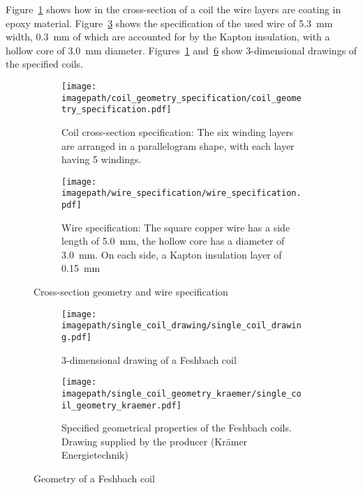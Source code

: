 Figure~\ref{fig:coil_geometry_specification} shows how in the cross-section of a coil the wire layers are coating in epoxy material. Figure~\ref{fig:wire_specification} shows the specification of the used wire of \SI{5.3}{\milli\meter} width, \SI{0.3}{\milli\meter} of which are accounted for by the Kapton insulation, with a hollow core of \SI{3.0}{\milli\meter} diameter. Figures~\ref{fig:coil_geometry_specification} and~\ref{fig:single_coil_geometry_kraemer} show 3-dimensional drawings of the specified coils.

\begin{figure}
    \centering
    \begin{subfigure}[t]{0.45\textwidth}
        \centering
        \texttt{[image: \\imagepath/coil\_geometry\_specification/coil\_geometry\_specification.pdf]}
        \caption{Coil cross-section specification: The six winding layers are arranged in a parallelogram shape, with each layer having 5 windings.}
        \label{fig:coil_geometry_specification}
    \end{subfigure}
    \hspace{0.09\textwidth}
    \begin{subfigure}[t]{0.45\textwidth}
        \centering
        \texttt{[image: \\imagepath/wire\_specification/wire\_specification.pdf]}
        \caption{Wire specification: The square copper wire has a side length of \SI{5.0}{\milli\meter}, the hollow core has a diameter of \SI{3.0}{\milli\meter}. On each side, a Kapton insulation layer of \SI{0.15}{\milli\meter} }
        \label{fig:wire_specification}
    \end{subfigure}
    \caption{Cross-section geometry and wire specification}
\end{figure}

\begin{figure}
    \centering
    \begin{subfigure}[t]{0.48\textwidth}
        \centering
        \texttt{[image: \\imagepath/single\_coil\_drawing/single\_coil\_drawing.pdf]}
        \caption{3-dimensional drawing of a Feshbach coil} 
        \label{fig:single_coil_drawing}
    \end{subfigure}
    \hspace{0.03\textwidth}
    \begin{subfigure}[t]{0.48\textwidth}
        \centering
        \texttt{[image: \\imagepath/single\_coil\_geometry\_kraemer/single\_coil\_geometry\_kraemer.pdf]}
        \caption{Specified geometrical properties of the Feshbach coils. Drawing supplied by the producer (Krämer Energietechnik)}
        \label{fig:single_coil_geometry_kraemer}
    \end{subfigure}
    \caption{Geometry of a Feshbach coil}
\end{figure}

